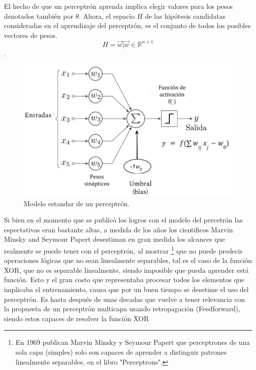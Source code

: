 El hecho de que un perceptrón aprenda implica elegir valores para los pesos denotados también por $\theta$.  Ahora, el espacio $H$ de las hipótesis candidatas consideradas en el aprendizaje del perceptrón, es el conjunto de todos los posibles vectores de pesos.  \[H = {\vec{w} |  \vec{w} \in \mathbb{R}^{n+1}}\].

\begin{figure}[h]
 \centering
 \includegraphics[scale=0.5]{../Figuras/Perceptron.png}
 \caption{Modelo estandar de un perceptrón.}
 \label{fig:unaNeurona2}
\end{figure}

Si bien en el momento que se publicó los logros con el modelo del percetrón las espectativas eran bastante altas, a medida de los años los cientificos Marvin Minsky and Seymour Papert desestiman en gran medida los alcances que realmente se puede tener con el perceptrón, al mostrar \footnote{ En 1969 publican Marvin Minsky y Seymour Papert que perceptrones de una sola capa (simples) solo son capaces de aprender a distinguir patrones linealmente separables, en el libro "Perceptrons".
} que no puede predecir operaciones lógicas que no sean linealmente separables, tal es el caso de la función XOR, que no es separable linealmente, siendo imposible que pueda aprender está función. Esto y el gran costo que representaba procesar todos los elementos que implicaba el entrenamiento, causa que por un buen tiempo se desetime el uso del perceptrón. Es hasta después de unas decadas que vuelve a tener relevancia con la propuesta de un perceptrón multicapa usando retropagación (Feedforward), siendo estos capaces de resolver la función XOR


